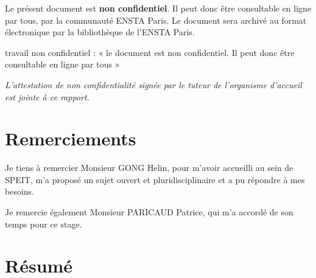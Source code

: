 \documentclass[12pt,a4paper,french]{report}
\newcommand{\organisme}{SPEIT}
\newcommand{\tuteurENSTA}{PARICAUD Patrice}
\newcommand{\tuteurOrganisme}{GONG Helin}
\begin{document}
\vspace{1cm}

\noindent Le présent document est \textbf{non confidentiel}. Il peut donc être
consultable en ligne par tous, par la communauté ENSTA Paris. Le document sera
archivé au format électronique par la bibliothèque de l'ENSTA Paris.

\vspace{1.5cm}

\noindent
travail non confidentiel : « le document est non confidentiel. Il peut donc être consultable en ligne par tous »



\vspace{2cm}

\noindent\textit{L'attestation de non confidentialité signée par le tuteur de
l'organisme d'accueil est jointe à ce rapport.}

\clearpage

\thispagestyle{empty}
\chapter*{Remerciements}

\vspace{0.5cm}


Je tiens à remercier Monsieur \tuteurOrganisme, pour m'avoir
accueilli au sein de \organisme{}, m'a proposé un sujet
ouvert et pluridisciplinaire et a pu répondre à mes besoins.

Je remercie également Monsieur \tuteurENSTA, qui m'a accordé de son temps pour ce stage.
\clearpage

\chapter*{Résumé}
\end{document}
